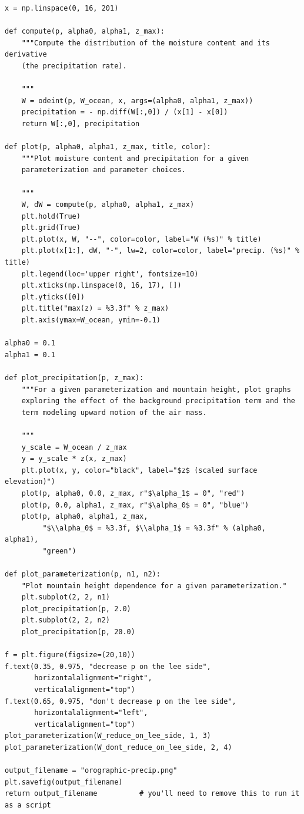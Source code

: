 \documentclass[11pt]{article}
\begin{document}
\begin{verbatim}
x = np.linspace(0, 16, 201)

def compute(p, alpha0, alpha1, z_max):
    """Compute the distribution of the moisture content and its derivative
    (the precipitation rate).

    """
    W = odeint(p, W_ocean, x, args=(alpha0, alpha1, z_max))
    precipitation = - np.diff(W[:,0]) / (x[1] - x[0])
    return W[:,0], precipitation

def plot(p, alpha0, alpha1, z_max, title, color):
    """Plot moisture content and precipitation for a given
    parameterization and parameter choices.

    """
    W, dW = compute(p, alpha0, alpha1, z_max)
    plt.hold(True)
    plt.grid(True)
    plt.plot(x, W, "--", color=color, label="W (%s)" % title)
    plt.plot(x[1:], dW, "-", lw=2, color=color, label="precip. (%s)" % title)
    plt.legend(loc='upper right', fontsize=10)
    plt.xticks(np.linspace(0, 16, 17), [])
    plt.yticks([0])
    plt.title("max(z) = %3.3f" % z_max)
    plt.axis(ymax=W_ocean, ymin=-0.1)

alpha0 = 0.1
alpha1 = 0.1

def plot_precipitation(p, z_max):
    """For a given parameterization and mountain height, plot graphs
    exploring the effect of the background precipitation term and the
    term modeling upward motion of the air mass.

    """
    y_scale = W_ocean / z_max
    y = y_scale * z(x, z_max)
    plt.plot(x, y, color="black", label="$z$ (scaled surface elevation)")
    plot(p, alpha0, 0.0, z_max, r"$\alpha_1$ = 0", "red")
    plot(p, 0.0, alpha1, z_max, r"$\alpha_0$ = 0", "blue")
    plot(p, alpha0, alpha1, z_max,
         "$\\alpha_0$ = %3.3f, $\\alpha_1$ = %3.3f" % (alpha0, alpha1),
         "green")

def plot_parameterization(p, n1, n2):
    "Plot mountain height dependence for a given parameterization."
    plt.subplot(2, 2, n1)
    plot_precipitation(p, 2.0)
    plt.subplot(2, 2, n2)
    plot_precipitation(p, 20.0)

f = plt.figure(figsize=(20,10))
f.text(0.35, 0.975, "decrease p on the lee side",
       horizontalalignment="right",
       verticalalignment="top")
f.text(0.65, 0.975, "don't decrease p on the lee side",
       horizontalalignment="left",
       verticalalignment="top")
plot_parameterization(W_reduce_on_lee_side, 1, 3)
plot_parameterization(W_dont_reduce_on_lee_side, 2, 4)

output_filename = "orographic-precip.png"
plt.savefig(output_filename)
return output_filename          # you'll need to remove this to run it as a script
\end{verbatim}
\end{document}
